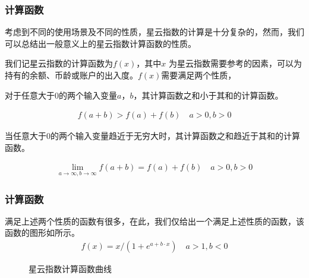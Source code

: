 \begin{frame}
\frametitle{计算函数}
考虑到不同的使用场景及不同的性质，星云指数的计算是十分复杂的，然而，我们可以总结出一般意义上的星云指数计算函数的性质。

我们记星云指数的计算函数为\(f(x)\)，其中\(x\)
为星云指数需要参考的因素，可以为持有的余额、币龄或账户的出入度。$f(x)$需要满足两个性质，

\begin{property}
对于任意大于$0$的两个输入变量$a$，$b$，其计算函数之和小于其和的计算函数。
\end{property}

\begin{align}
f(a+b)>f(a)+f(b) \quad a>0,b>0
\end{align}

\begin{property}
当任意大于$0$的两个输入变量趋近于无穷大时，其计算函数之和趋近于其和的计算函数。
\end{property}

\begin{align}
\lim\limits_{a \to \infty, b\to \infty} f(a+b) = f(a) + f(b)\quad a>0, b>0
\end{align}

\end{frame}

\begin{frame}
\frametitle{计算函数}
\noindent 满足上述两个性质的函数有很多，在此，我们仅给出一个满足上述性质的函数，该函数的图形如所示。
\begin{align}
f(x) = x/(1 + e^{a + b\cdot x}) \quad a>1,b<0
\end{align}

\begin{figure}
\centering
{}
\caption{星云指数计算函数曲线 \label{fig-nr}}
\end{figure}
\end{frame}

